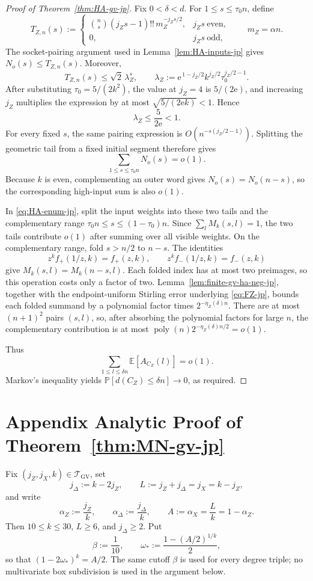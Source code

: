\documentclass[11pt]{article}
\theoremstyle{definition}
\newcommand{\engappendixsection}[2]{%
  \refstepcounter{section}%
  \section*{Appendix \thesection\quad #1}%
  \label{#2}%
}
\newcommand{\EE}{\mathbb E}
\newcommand{\PP}{\mathbb P}
\newcommand{\CZ}{C_Z}
\begin{document}
\begin{proof}[Proof of Theorem~\ref{thm:HA-gv-jp}]
Fix \(0<\delta<d\).  For \(1\le s\le\tau_0n\), define
\[
T_{Z,n}(s):=
\begin{cases}
\binom ns(j_Zs-1)!!\,m_Z^{-j_Zs/2},&j_Zs\ \text{even},\\
0,&j_Zs\ \text{odd},
\end{cases}
\qquad m_Z=\alpha n.
\]
The socket-pairing argument used in
Lemma~\ref{lem:HA-inputs-jp} gives \(N_o(s)\le T_{Z,n}(s)\).  Moreover,
\[
T_{Z,n}(s)\le\sqrt2\,\lambda_Z^s,
\qquad
\lambda_Z:=
\mathrm e^{\,1-j_Z/2}k^{j_Z/2}\tau_0^{j_Z/2-1}.
\]
After substituting \(\tau_0=5/(2k^2)\), the value at \(j_Z=4\) is
\(5/(2\mathrm e)\), and increasing \(j_Z\) multiplies the expression by
at most \(\sqrt{5/(2\mathrm e k)}<1\).  Hence
\[
\lambda_Z\le\frac5{2\mathrm e}<1.
\]
For every fixed \(s\), the same pairing expression is
\(O(n^{-s(j_Z/2-1)})\).  Splitting the geometric tail from a fixed
initial segment therefore gives
\[
\sum_{1\le s\le\tau_0n}N_o(s)=o(1).
\]
Because \(k\) is even, complementing an outer word gives
\(N_o(s)=N_o(n-s)\), so the corresponding high-input sum is also \(o(1)\).

In \eqref{eq:HA-enum-jp}, split the input weights into these two tails and
the complementary range \(\tau_0n\le s\le(1-\tau_0)n\).  Since
\(\sum_lM_k(s,l)=1\), the two tails contribute \(o(1)\) after summing over
all visible weights.  On the complementary range, fold \(s>n/2\) to
\(n-s\).  The identities
\[
z^kf_+(1/z,k)=f_+(z,k),\qquad z^kf_-(1/z,k)=f_-(z,k)
\]
give \(M_k(s,l)=M_k(n-s,l)\).  Each folded index has at most two
preimages, so this operation costs only a factor of two.
Lemma~\ref{lem:finite-gv-ha-neg-jp}, together with the endpoint-uniform
Stirling error underlying \eqref{eq:FZ-jp}, bounds each folded summand by
a polynomial factor times \(2^{-\eta_Z(\delta)n}\).  There are at most
\((n+1)^2\) pairs \((s,l)\), so, after absorbing the polynomial factors
for large \(n\), the complementary contribution is at most
\(\operatorname{poly}(n)2^{-\eta_Z(\delta)n/2}=o(1)\).

Thus
\[
\sum_{1\le l\le\delta n}\EE[A_{\CZ}(l)]=o(1).
\]
Markov's inequality yields
\(\PP[d(\CZ)\le\delta n]\to0\), as required.
\end{proof}


\engappendixsection{Analytic Proof of Theorem~\ref{thm:MN-gv-jp}}{app:finite-gv-mn-jp}

Fix \((j_Z,j_X,k)\in\mathcal T_{\mathrm{GV}}\), set
\[
j_\Delta:=k-2j_Z,\qquad L:=j_Z+j_\Delta=j_X=k-j_Z,
\]
and write
\[
\alpha_Z:=\frac{j_Z}{k},\qquad
\alpha_\Delta:=\frac{j_\Delta}{k},\qquad
A:=\alpha_X=\frac Lk=1-\alpha_Z.
\]
Then \(10\le k\le30\), \(L\ge6\), and \(j_\Delta\ge2\).  Put
\[
\beta:=\frac1{10},\qquad
\omega_*:=\frac{1-(A/2)^{1/k}}2,
\]
so that \((1-2\omega_*)^k=A/2\).  The same cutoff \(\beta\) is used for
every degree triple; no multivariate
box subdivision is used in the argument below.
\end{document}
